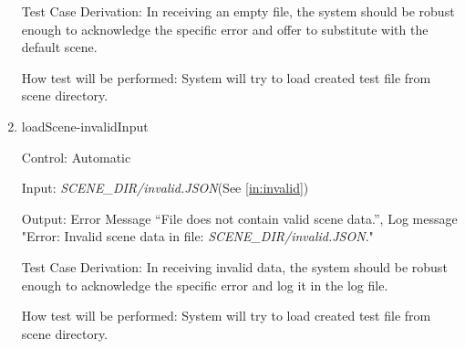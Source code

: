 \documentclass[12pt, titlepage]{article}
\begin{document}
\begin{enumerate}
Test Case Derivation: In receiving an empty file, the system should be robust 
enough to acknowledge the specific error and offer to substitute with the 
default scene.

How test will be performed: System will try to load created test file from 
scene directory.

\item{loadScene-invalidInput\\}

Control: Automatic

Input: \textit{SCENE\_DIR/invalid.JSON}(See \ref{in:invalid})

Output: Error Message ``File does not contain valid scene data.'', Log message 
"Error: Invalid scene data in file: \textit{SCENE\_DIR/invalid.JSON}."

Test Case Derivation: In receiving invalid data, the system should be robust 
enough to acknowledge the specific error and log it in the log file.

How test will be performed: System will try to load created test file from 
scene directory. 

\end{enumerate}
\end{document}
